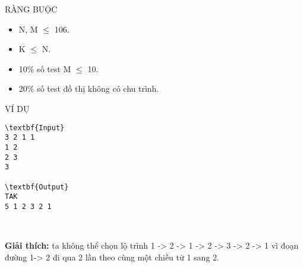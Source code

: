 RÀNG BUỘC
\begin{itemize}
	\item N, M  $\le$  106.
	\item K  $\le$  N.
	\item 10\% số test M  $\le$  10.
	\item 20\% số test đồ thị không có chu trình.
\end{itemize}
VÍ DỤ
\begin{verbatim}
\textbf{Input}
3 2 1 1
1 2
2 3
3

\textbf{Output}
TAK
5 1 2 3 2 1\end{verbatim}

 

\textbf{Giải thích:} ta không thể chọn lộ trình 1 -> 2 -> 1 -> 2 -> 3 -> 2 -> 1 vì đoạn đường 1-> 2 đi qua 2 lần theo cùng một chiều từ 1 sang 2.